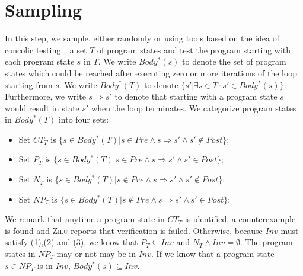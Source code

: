 
\section{Sampling}
In this step, we sample, either randomly or using tools based on the idea of concolic testing~\cite{}, a set $T$ of program states and test the program starting with each program state $s$ in $T$. We write $Body^*(s)$ to denote the set of program states which could be reached after executing zero or more iterations of the loop starting from $s$. We write $Body^*(T)$ to denote $\{s' | \exists s \in T \cdot s' \in Body^*(s)\}$. Furthermore, we write $s \Rightarrow s'$ to denote that starting with a program state $s$ would result in state $s'$ when the loop terminates. We categorize program states in $Body^*(T)$ into four sets:
\begin{itemize}
    \item Set $CT_T$ is $\{s \in Body^*(T) | s \in Pre \land s \Rightarrow s' \land s' \notin Post\}$;
    \item Set $P_T$ is $\{s \in Body^*(T) | s \in Pre \land s \Rightarrow s' \land s' \in Post\}$;
    \item Set $N_T$ is $\{s \in Body^*(T) | s \notin Pre \land s \Rightarrow s' \land s' \notin Post\}$;
    \item Set $NP_T$ is $\{s \in Body^*(T) | s \notin Pre \land s \Rightarrow s' \land s' \in Post\}$;
\end{itemize}
We remark that anytime a program state in $CT_T$ is identified, a counterexample is found 
and \textsc{Zilu} reports that verification is failed. 
Otherwise, because $Inv$ must satisfy (1),(2) and (3), we know that $P_T \subseteq Inv$ 
and $N_T \land Inv = \emptyset$. 
The program states in $NP_T$ may or not may be in $Inv$. 
If we know that a program state $s \in NP_T$ is in $Inv$, $Body^*(s) \subseteq Inv$.

\begin{example}
\end{example}
